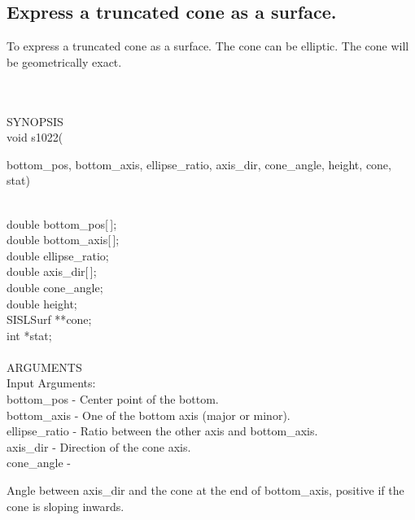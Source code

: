 \subsection{Express a truncated cone as a surface.}
\begin{minipg1}
  To express a truncated cone as a surface. The cone can be elliptic.
  The cone will be geometrically exact.
\end{minipg1}\\ \\
SYNOPSIS\\
        \>void s1022(\begin{minipg3}
        {\fov bottom\_pos}, {\fov bottom\_axis}, {\fov ellipse\_ratio}, {\fov axis\_dir},
        {\fov cone\_angle}, {\fov height}, {\fov cone}, {\fov stat})
      \end{minipg3}\\[0.3ex]
      \>\>    double \> {\fov bottom\_pos}[\,];\\
      \>\>    double \> {\fov bottom\_axis}[\,];\\
      \>\>    double \> {\fov ellipse\_ratio};\\
      \>\>    double \> {\fov axis\_dir}[\,];\\
      \>\>    double \> {\fov cone\_angle};\\
      \>\>    double \> {\fov height};\\
      \>\>    SISLSurf \> **{\fov cone};\\
      \>\>    int    \> *{\fov stat};\\
\\
ARGUMENTS\\
        \>Input Arguments:\\
        \>\>    {\fov bottom\_pos}  \> - \> Center point of the bottom.\\
        \>\>    {\fov bottom\_axis} \> - \> One of the bottom axis (major or minor).\\
        \>\>    {\fov ellipse\_ratio} \> - \> Ratio between the other axis and bottom\_axis.\\
        \>\>    {\fov axis\_dir}    \> - \> Direction of the cone axis.\\
        \>\>    {\fov cone\_angle}  \> - \> \begin{minipg2}
                                              Angle between axis\_dir
                                              and the cone at the end of
                                              bottom\_axis, positive if
                                              the cone is sloping
                                              inwards.
                                            \end{minipg2}\\[0.8ex]
